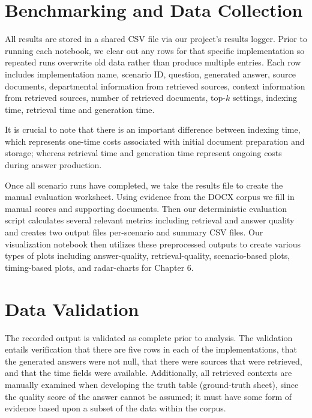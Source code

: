 \section{Benchmarking and Data Collection}
All results are stored in a shared CSV file via our project's results logger. Prior to running each notebook, we clear out any rows for that specific implementation so repeated runs overwrite old data rather than produce multiple entries. Each row includes implementation name, scenario ID, question, generated answer, source documents, departmental information from retrieved sources, context information from retrieved sources, number of retrieved documents, top-\( k \) settings, indexing time, retrieval time and generation time.

It is crucial to note that there is an important difference between indexing time, which represents one-time costs associated with initial document preparation and storage; whereas retrieval time and generation time represent ongoing costs during answer production.

Once all scenario runs have completed, we take the results file to create the manual evaluation worksheet. Using evidence from the DOCX corpus we fill in manual scores and supporting documents. Then our deterministic evaluation script calculates several relevant metrics including retrieval and answer quality and creates two output files per-scenario and summary CSV files. Our visualization notebook then utilizes these preprocessed outputs to create various types of plots including answer-quality, retrieval-quality, scenario-based plots, timing-based plots, and radar-charts for Chapter 6.


\section{Data Validation}
The recorded output is validated as complete prior to analysis. The validation entails verification that there are five rows in each of the implementations, that the generated answers were not null, that there were sources that were retrieved, and that the time fields were available. Additionally, all retrieved contexts are manually examined when developing the truth table (ground-truth sheet), since the quality score of the answer cannot be assumed; it must have some form of evidence based upon a subset of the data within the corpus.

